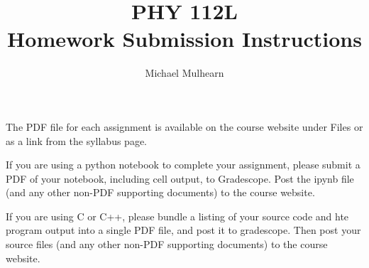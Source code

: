 \documentclass[12pt]{article}
\begin{document}
\title{PHY 112L \\ Homework Submission Instructions }
\author{Michael Mulhearn}

\maketitle

The PDF file for each assignment is available on the course website under Files or as a link from the syllabus page.

If you are using a python notebook to complete your assignment, please
submit a PDF of your notebook, including cell output, to Gradescope.  Post the
ipynb file (and any other non-PDF supporting documents) to the course
website.

If you are using C or C++, please bundle a listing of your source code and hte program output into a single PDF file, and post it to gradescope.  Then post your source files (and any other non-PDF supporting documents) to the course
website.
\end{document}
